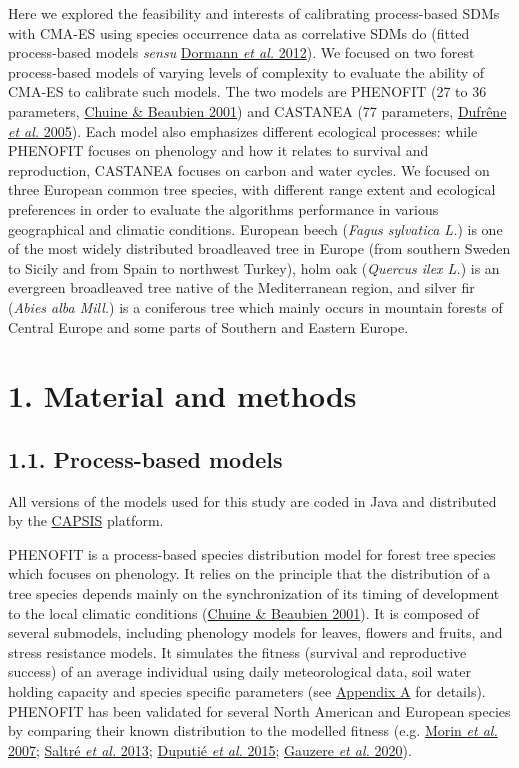 \documentclass[11pt,]{article}
\begin{document}
Here we explored the feasibility and interests of calibrating
process-based SDMs with CMA-ES using species occurrence data as
correlative SDMs do (fitted process-based models \emph{sensu}
\protect\hyperlink{ref-Dormann2012}{Dormann \emph{et al.} 2012}). We
focused on two forest process-based models of varying levels of
complexity to evaluate the ability of CMA-ES to calibrate such models.
The two models are PHENOFIT (27 to 36 parameters,
\protect\hyperlink{ref-Chuine2001}{Chuine \& Beaubien 2001}) and
CASTANEA (77 parameters, \protect\hyperlink{ref-Dufrene2005}{Dufrêne
\emph{et al.} 2005}). Each model also emphasizes different ecological
processes: while PHENOFIT focuses on phenology and how it relates to
survival and reproduction, CASTANEA focuses on carbon and water cycles.
We focused on three European common tree species, with different range
extent and ecological preferences in order to evaluate the algorithms
performance in various geographical and climatic conditions. European
beech (\emph{Fagus sylvatica L.}) is one of the most widely distributed
broadleaved tree in Europe (from southern Sweden to Sicily and from
Spain to northwest Turkey), holm oak (\emph{Quercus ilex L.}) is an
evergreen broadleaved tree native of the Mediterranean region, and
silver fir (\emph{Abies alba Mill.}) is a coniferous tree which mainly
occurs in mountain forests of Central Europe and some parts of Southern
and Eastern Europe.

\hypertarget{methods}{%
\section{1. Material and methods}\label{methods}}

\hypertarget{pbmodels}{%
\subsection{1.1. Process-based models}\label{pbmodels}}

All versions of the models used for this study are coded in Java and
distributed by the \href{https://capsis.cirad.fr/capsis/home}{CAPSIS}
platform.

PHENOFIT is a process-based species distribution model for forest tree
species which focuses on phenology. It relies on the principle that the
distribution of a tree species depends mainly on the synchronization of
its timing of development to the local climatic conditions
(\protect\hyperlink{ref-Chuine2001}{Chuine \& Beaubien 2001}). It is
composed of several submodels, including phenology models for leaves,
flowers and fruits, and stress resistance models. It simulates the
fitness (survival and reproductive success) of an average individual
using daily meteorological data, soil water holding capacity and species
specific parameters (see \protect\hyperlink{appendixA}{Appendix A} for
details). PHENOFIT has been validated for several North American and
European species by comparing their known distribution to the modelled
fitness (e.g. \protect\hyperlink{ref-Morin2007}{Morin \emph{et al.}
2007}; \protect\hyperlink{ref-Saltre2013}{Saltré \emph{et al.} 2013};
\protect\hyperlink{ref-Duputie2015}{Duputié \emph{et al.} 2015};
\protect\hyperlink{ref-Gauzere2020}{Gauzere \emph{et al.} 2020}).
\end{document}
